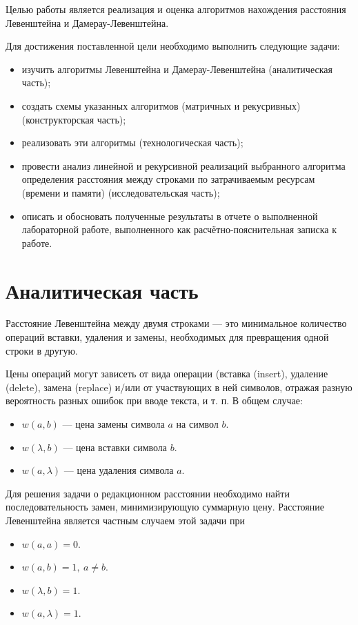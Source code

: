 \documentclass[12pt]{report}
\begin{document}
	Целью работы является реализация и оценка алгоритмов нахождения расстояния Левенштейна и Дамерау-Левенштейна.
	
	Для достижения поставленной цели необходимо выполнить следующие задачи:
	
	\begin{itemize}
		\item изучить алгоритмы Левенштейна и Дамерау-Левенштейна (аналитическая часть);
		\item создать схемы указанных алгоритмов (матричных и рекусривных) (конструкторская часть);
		\item реализовать эти алгоритмы (технологическая часть);
		\item провести анализ линейной и рекурсивной реализаций выбранного алгоритма определения расстояния между строками по затрачиваемым ресурсам (времени и памяти) (исследовательская часть);
		\item описать и обосновать полученные результаты в отчете о выполненной лабораторной работе, выполненного как расчётно-пояснительная записка к работе.
	\end{itemize}
	
	\chapter{Аналитическая часть}
	
	Расстояние Левенштейна \cite{Levenshtein} между двумя строками — это минимальное количество операций вставки, удаления и замены, необходимых для превращения одной строки в другую.
	
	
	Цены операций могут зависеть от вида операции (вставка (insert), удаление (delete), замена (replace) и/или от участвующих в ней символов, отражая разную вероятность разных ошибок при вводе текста, и т. п. В общем случае:
	
	\begin{itemize}
		\item $w(a,b)$ — цена замены символа $a$ на символ $b$.
		\item $w(\lambda,b)$ — цена вставки символа $b$.
		\item $w(a,\lambda)$ — цена удаления символа $a$.
	\end{itemize}
	
	Для решения задачи о редакционном расстоянии необходимо найти последовательность замен, минимизирующую суммарную цену. Расстояние Левенштейна является частным случаем этой задачи при
	
	\begin{itemize}
		\item $w(a,a)=0$.
		\item $w(a,b)=1, \medspace a \neq b$.
		\item $w(\lambda,b)=1$.
		\item $w(a,\lambda)=1$.
	\end{itemize}
	
\end{document}
